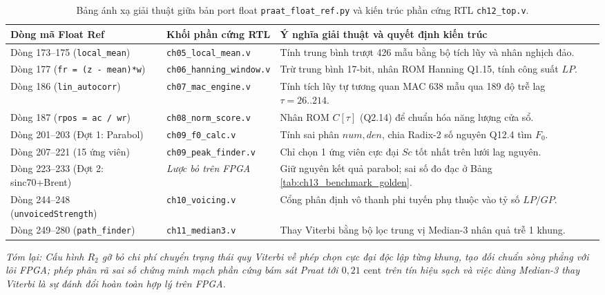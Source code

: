 \begin{table}[htbp]
\centering
\caption{Bảng ánh xạ giải thuật giữa bản port float \texttt{praat\_float\_ref.py} và kiến trúc phần cứng RTL \texttt{ch12\_top.v}.}
\label{tab:ch13_float_vs_hdl_mapping}
\footnotesize
\begin{tabularx}{\linewidth}{>{\raggedright\arraybackslash}p{4.0cm}>{\raggedright\arraybackslash}p{3.4cm}>{\raggedright\arraybackslash}X}
\toprule
\textbf{Dòng mã Float Ref} & \textbf{Khối phần cứng RTL} & \textbf{Ý nghĩa giải thuật và quyết định kiến trúc} \\
\midrule
Dòng 173--175 (\texttt{local\_mean}) & \texttt{ch05\_}\allowbreak\texttt{local\_mean.v} & Tính trung bình trượt 426 mẫu bằng bộ tích lũy và nhân nghịch đảo. \\
Dòng 177 (\texttt{fr = (z - mean)*w}) & \texttt{ch06\_}\allowbreak\texttt{hanning\_}\allowbreak\texttt{window.v} & Trừ trung bình 17-bit, nhân ROM Hanning Q1.15, tính công suất $LP$. \\
Dòng 186 (\texttt{lin\_autocorr}) & \texttt{ch07\_}\allowbreak\texttt{mac\_engine.v} & Tính tích lũy tự tương quan MAC 638 mẫu qua 189 độ trễ lag $\tau = 26..214$. \\
Dòng 187 (\texttt{rpos = ac / wr}) & \texttt{ch08\_}\allowbreak\texttt{norm\_score.v} & Nhân ROM $C[\tau]$ (Q2.14) để chuẩn hóa năng lượng cửa sổ. \\
Dòng 201--203 (Đợt 1: Parabol) & \texttt{ch09\_}\allowbreak\texttt{f0\_calc.v} & Tính sai phân $num, den$, chia Radix-2 số nguyên Q12.4 tìm $F_0$. \\
Dòng 207--221 (15 ứng viên) & \texttt{ch09\_}\allowbreak\texttt{peak\_finder.v} & Chỉ chọn 1 ứng viên cực đại $Sc$ tốt nhất trên lưới lag nguyên. \\
Dòng 223--233 (Đợt 2: sinc70+Brent) & \emph{Lược bỏ trên FPGA} & Giữ nguyên kết quả parabol; sai số đo đạc ở Bảng \ref{tab:ch13_benchmark_golden}. \\
Dòng 244--248 (\texttt{unvoicedStrength}) & \texttt{ch10\_}\allowbreak\texttt{voicing.v} & Cổng phân định vô thanh phi tuyến phụ thuộc vào tỷ số $LP/GP$. \\
Dòng 249--280 (\texttt{path\_finder}) & \texttt{ch11\_}\allowbreak\texttt{median3.v} & Thay Viterbi bằng bộ lọc trung vị Median-3 nhân quả trễ 1 khung. \\
\bottomrule
\end{tabularx}
\end{table}

\textit{Tóm lại: Cấu hình $R_2$ gỡ bỏ chi phí chuyển trạng thái quy Viterbi về phép chọn cực đại độc lập từng khung, tạo đối chuẩn sòng phẳng với lõi FPGA; phép phân rã sai số chứng minh mạch phần cứng bám sát Praat tới $0{,}21\text{ cent}$ trên tín hiệu sạch và việc dùng Median-3 thay Viterbi là sự đánh đổi hoàn toàn hợp lý trên FPGA.}

